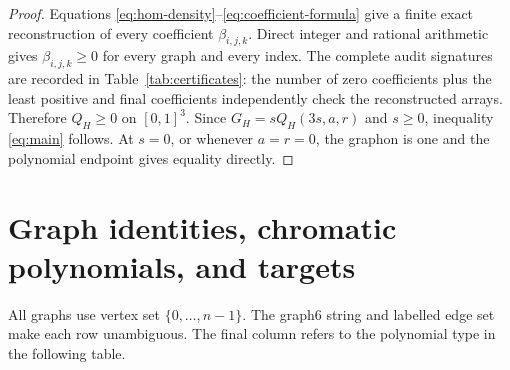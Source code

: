 \documentclass[11pt]{article}
\begin{document}
\begin{proof}
Equations \eqref{eq:hom-density}--\eqref{eq:coefficient-formula} give a finite
exact reconstruction of every coefficient $\beta_{i,j,k}$.  Direct integer
and rational arithmetic gives $\beta_{i,j,k}\geq0$ for every graph and every
index.  The complete audit signatures are recorded in
Table~\ref{tab:certificates}: the number of zero coefficients plus the least
positive and final coefficients independently check the reconstructed
arrays.  Therefore $Q_H\geq0$ on $[0,1]^3$.  Since
$G_H=sQ_H(3s,a,r)$ and $s\geq0$, inequality \eqref{eq:main} follows.  At
$s=0$, or whenever $a=r=0$, the graphon is one and the polynomial endpoint
gives equality directly.
\end{proof}


\section{Graph identities, chromatic polynomials, and targets}

All graphs use vertex set $\{0,\ldots,n-1\}$.  The graph6 string and labelled
edge set make each row unambiguous.  The final column refers to the polynomial
type in the following table.
\end{document}
